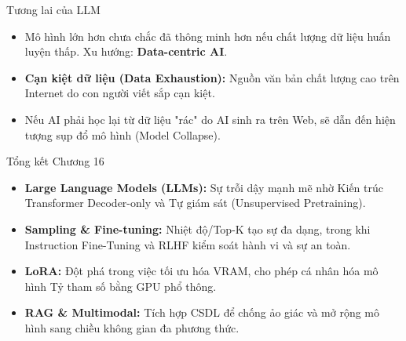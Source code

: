 \documentclass[aspectratio=169]{beamer}
\begin{document}
\begin{frame}{Tương lai của LLM}
    \begin{itemize}
        \item Mô hình lớn hơn chưa chắc đã thông minh hơn nếu chất lượng dữ liệu huấn luyện thấp. Xu hướng: \textbf{Data-centric AI}.
        \item \textbf{Cạn kiệt dữ liệu (Data Exhaustion):} Nguồn văn bản chất lượng cao trên Internet do con người viết sắp cạn kiệt.
        \item Nếu AI phải học lại từ dữ liệu "rác" do AI sinh ra trên Web, sẽ dẫn đến hiện tượng sụp đổ mô hình (Model Collapse).
    \end{itemize}
\end{frame}

\begin{frame}{Tổng kết Chương 16}
    \begin{itemize}
        \item \textbf{Large Language Models (LLMs):} Sự trỗi dậy mạnh mẽ nhờ Kiến trúc Transformer Decoder-only và Tự giám sát (Unsupervised Pretraining).
        \item \textbf{Sampling \& Fine-tuning:} Nhiệt độ/Top-K tạo sự đa dạng, trong khi Instruction Fine-Tuning và RLHF kiểm soát hành vi và sự an toàn.
        \item \textbf{LoRA:} Đột phá trong việc tối ưu hóa VRAM, cho phép cá nhân hóa mô hình Tỷ tham số bằng GPU phổ thông.
        \item \textbf{RAG \& Multimodal:} Tích hợp CSDL để chống ảo giác và mở rộng mô hình sang chiều không gian đa phương thức.
    \end{itemize}
\end{frame}
\end{document}
